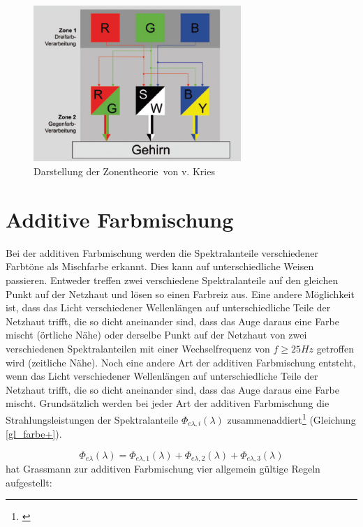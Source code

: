 \begin{figure}[H]     %
\centering
\includegraphics[width=0.7\textwidth]{bilder/zonen} 
\caption {Darstellung der \glqq Zonentheorie\grqq\ von v. Kries\protect\footnotemark}\label{b_zonen}
\end{figure}

\section{Additive Farbmischung} \label{sec_farbmischung+}

Bei der additiven Farbmischung werden die Spektralanteile verschiedener Farbtöne als Mischfarbe erkannt. Dies kann auf unterschiedliche Weisen passieren. Entweder treffen zwei verschiedene Spektralanteile auf den gleichen Punkt auf der Netzhaut und lösen so einen Farbreiz aus. Eine andere Möglichkeit ist, dass das Licht verschiedener Wellenlängen  auf unterschiedliche Teile der Netzhaut trifft, die so dicht aneinander sind, dass das Auge daraus eine Farbe mischt (örtliche Nähe) oder derselbe Punkt auf der Netzhaut von zwei verschiedenen Spektralanteilen mit einer Wechselfrequenz von $f\geq25Hz$ getroffen wird (zeitliche Nähe). Noch eine andere Art der additiven Farbmischung entsteht, wenn das Licht verschiedener Wellenlängen auf unterschiedliche Teile der Netzhaut trifft, die so dicht aneinander sind, dass das Auge daraus eine Farbe mischt.
Grundsätzlich werden bei jeder Art der additiven Farbmischung die Strahlungsleistungen der Spektralanteile $\Phi_{e\lambda,i}(\lambda)$ zusammenaddiert\footnote{\cite[83]{greule}} (Gleichung \ref{gl_farbe+}).

	\begin{equation}\label{gl_farbe+}
		\Phi_{e\lambda}(\lambda) = \Phi_{e\lambda,1}(\lambda) + \Phi_{e\lambda,2}(\lambda) + \Phi_{e\lambda,3}(\lambda)
	\end{equation}
\newpage
{} hat Grassmann zur additiven Farbmischung vier allgemein gültige Regeln aufgestellt: 

